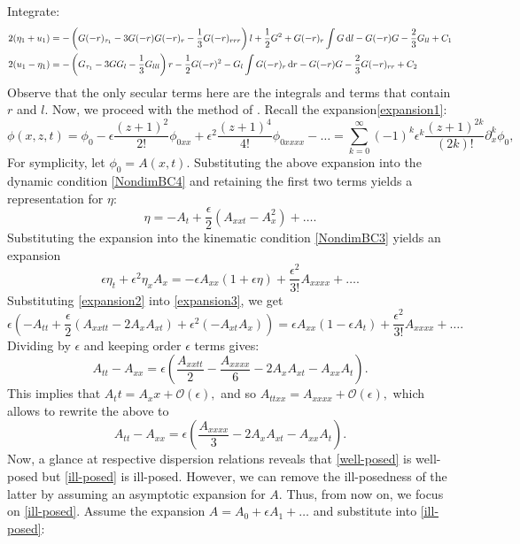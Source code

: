\documentclass[10pt,reqno,oneside,a4paper]{article}
\begin{document}
Integrate:
\begin{align*}
2(\eta_{1} + u_{1}) &= -\left(G(-r)_{\tau_1} - 3G(-r)G(-r)_r - \frac{1}{3} G(-r)_{rrr}\right)l + \frac{1}{2}G^2  + G(-r)_r \int G \,\mathrm{d} l - G(-r)G - \frac{2}{3} G_{ll} + C_1 \\
2(u_{1} - \eta_{1}) &=  - \left(G_{\tau_1} - 3GG_l - \frac{1}{3}G_{lll}\right)r -  \frac{1}{2}G(-r)^2 - G_l \int G(-r)_r \,\mathrm{d} r - G(-r)G   - \frac{2}{3}G(-r)_{rr} +C_2 
\end{align*}
Observe that the only secular terms here are the integrals and terms that contain $r$ and $l.$
\newline Now, we proceed with the method of \cite{bernard}. Recall the expansion\eqref{expansion1}:
\[
\phi(x,z,t) = \phi_0 - \epsilon\frac{(z+1)^2}{2!}\phi_{0xx} + \epsilon^2 \frac{(z+1)^4}{4!}\phi_{0xxxx} - \ldots = \sum^{\infty}_{k=0} (-1)^k \epsilon^k \frac{(z+1)^{2k}}{(2k)!} \partial^k_x \phi_0,
\]
For symplicity, let $\phi_0 = A(x,t).$ Substituting the above expansion into the dynamic condition \eqref{NondimBC4} and retaining the first two terms yields a representation for $\eta:$
\begin{equation}\label{expansion2}
\eta = -A_t + \frac{\epsilon}{2}(A_{xxt} - A_x^2) + \ldots .
\end{equation}
Substituting the expansion into the kinematic condition \eqref{NondimBC3} yields an expansion
\begin{equation}\label{expansion3}
\epsilon \eta_t + \epsilon^2 \eta_x A_x = -\epsilon A_{xx}(1+ \epsilon \eta) + \frac{\epsilon^2}{3!}A_{xxxx} + \ldots .
\end{equation}
Substituting \eqref{expansion2} into \eqref{expansion3}, we get 
\begin{equation}\label{well-posed}
\epsilon(-A_{tt} + \frac{\epsilon}{2}(A_{xxtt} - 2A_xA_{xt})+\epsilon^2(-A_{xt}A_x)) = \epsilon A_{xx}(1- \epsilon A_t) + \frac{\epsilon^2}{3!}A_{xxxx} + \ldots.
\end{equation}
Dividing by $\epsilon$ and keeping order $\epsilon$ terms gives:
\[ 
A_{tt} - A_{xx} = \epsilon(\frac{A_{xxtt}}{2} - \frac{A_{xxxx}}{6} - 2A_xA_{xt} - A_{xx}A_{t}).
\]
This implies that $A_tt = A_xx + \mathcal{O}(\epsilon),$ and so $A_{ttxx} = A_{xxxx} + \mathcal{O}(\epsilon),$ which allows to rewrite the above to
\begin{equation}\label{ill-posed}
A_{tt} - A_{xx} = \epsilon(\frac{A_{xxxx}}{3} - 2A_xA_{xt} - A_{xx}A_{t}).
\end{equation}
Now, a glance at respective dispersion relations reveals that \eqref{well-posed} is well-posed but \eqref{ill-posed} is ill-posed. However, we can remove the ill-posedness of the latter by assuming an asymptotic expansion for $A.$ Thus, from now on, we focus on \eqref{ill-posed}. Assume the expansion $A= A_0 + \epsilon A_1 + \ldots$ and substitute into \eqref{ill-posed}:
\end{document}

